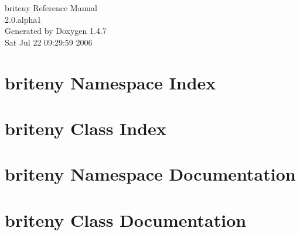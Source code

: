 \documentclass[a4paper]{book}
\begin{document}
\begin{titlepage}
\vspace*{7cm}
\begin{center}
{\Large briteny Reference Manual\\[1ex]\large 2.0.alpha1 }\\
\vspace*{1cm}
{\large Generated by Doxygen 1.4.7}\\
\vspace*{0.5cm}
{\small Sat Jul 22 09:29:59 2006}\\
\end{center}
\end{titlepage}
\clearemptydoublepage
{}
\tableofcontents
\clearemptydoublepage
{}
\chapter{briteny Namespace Index}

\chapter{briteny Class Index}

\chapter{briteny Namespace Documentation}


\chapter{briteny Class Documentation}


\printindex
\end{document}
